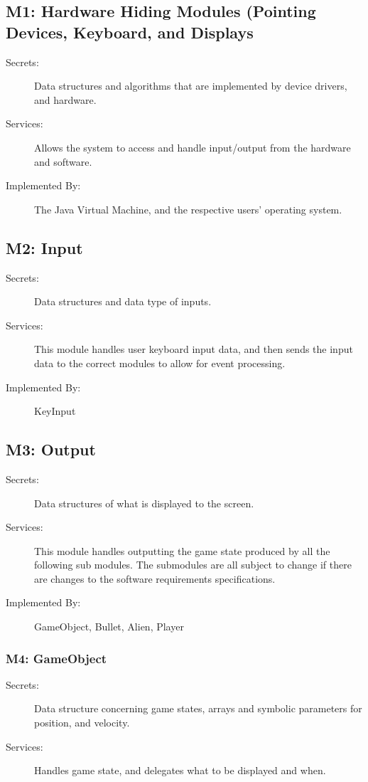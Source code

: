 \documentclass[12pt, titlepage]{article}
\begin{document}
\subsection{M1: Hardware Hiding Modules (Pointing Devices, Keyboard, and Displays}
\begin{description}
\item[Secrets:] Data structures and algorithms that are implemented by device drivers, and hardware.
\item[Services:] Allows the system to access and handle input/output from the hardware and software.
\item[Implemented By:] The Java Virtual Machine, and the respective users' operating system.
\end{description}

\subsection{M2: Input}
\begin{description}
\item[Secrets:] Data structures and data type of inputs.
\item[Services:] This module handles user keyboard input data, and then sends the input data to the correct modules to allow for event processing.
\item[Implemented By:] KeyInput
\end{description}

\subsection{M3: Output}
\begin{description}
\item[Secrets:] Data structures of what is displayed to the screen.
\item[Services:] This module handles outputting the game state produced by all the following sub modules. The submodules are all subject to change if there are changes to the software requirements specifications.
\item[Implemented By:] GameObject, Bullet, Alien, Player
\end{description}

\subsubsection{M4: GameObject}
\begin{description}
\item[Secrets:] Data structure concerning game states, arrays and symbolic parameters for position, and velocity.
\item[Services:] Handles game state, and delegates what to be displayed and when.
\end{description}
\end{document}
